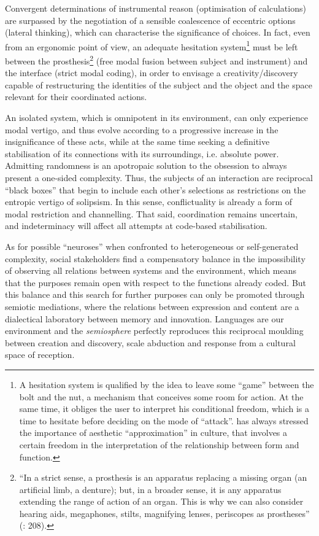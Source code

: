 \documentclass[output=paper]{langscibook}
\begin{document}
Convergent determinations of instrumental reason (optimisation of calculations) are surpassed by the negotiation of a sensible coalescence of eccentric options (lateral thinking), which can characterise the significance of choices. In fact, even from an ergonomic point of view, an adequate hesitation system\footnote{A hesitation system is qualified by the idea to leave some “game” between the bolt and the nut, a mechanism that conceives some room for action. At the same time, it obliges the user to interpret his conditional freedom, which is a time to hesitate before deciding on the mode of “attack”. \citet[305]{Leroi-Gourhan1993} has always stressed the importance of aesthetic “approximation”  in culture, that involves a certain freedom in the interpretation of the relationship between form and function.} must be left between the prosthesis\footnote{“In a strict sense, a prosthesis is an apparatus replacing a missing organ (an artificial limb, a denture); but, in a broader sense, it is any apparatus extending the range of action of an organ. This is why we can also consider hearing aids, megaphones, stilts, magnifying lenses, periscopes as prostheses” (\citealt{Eco1994}:  208).} (free modal fusion between subject and instrument) and the interface (strict modal coding), in order to envisage a creativity/discovery capable of restructuring the identities of the subject and the object and the space relevant for their coordinated actions.

An isolated system, which is omnipotent in its environment, can only experience modal vertigo, and thus evolve according to a progressive increase in the insignificance of these acts, while at the same time seeking a definitive stabilisation of its connections with its surroundings, i.e. absolute power. Admitting randomness is an apotropaic solution to the obsession to always present a one-sided complexity. Thus, the subjects of an interaction are reciprocal “black boxes” that begin to include each other's selections as restrictions on the entropic vertigo of solipsism. In this sense, conflictuality is already a form of modal restriction and channelling. That said, coordination remains uncertain, and indeterminacy will affect all attempts at code-based stabilisation. 

\begin{sloppypar}
As for possible “neuroses” when confronted to heterogeneous or self-generated complexity, social stakeholders find a compensatory balance in the impossibility of observing all relations between systems and the environment, which means that the purposes remain open with respect to the functions already coded. But this balance and this search for further purposes can only be promoted through semiotic mediations, where the relations between expression and content are a dialectical laboratory between memory and innovation. Languages are our environment and the \textit{semiosphere} \citep{Lotman2005} perfectly reproduces this reciprocal moulding between creation and discovery, scale abduction and response from a cultural space of reception. 
\end{sloppypar}
\end{document}
